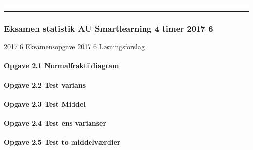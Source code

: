 \documentclass[]{book}
\let\oldparagraph\paragraph
\renewcommand{\paragraph}[1]{\oldparagraph{#1}\mbox{}}
\begin{document}
\begin{center}\rule{0.5\linewidth}{\linethickness}\end{center}

\begin{center}\rule{0.5\linewidth}{\linethickness}\end{center}

\hypertarget{eksamen-statistik-au-smartlearning-4-timer-2017-6}{%
\subsubsection{Eksamen statistik AU Smartlearning 4 timer 2017
6}\label{eksamen-statistik-au-smartlearning-4-timer-2017-6}}

\href{https://www.dropbox.com/s/dlgt1hnh6wu4aja/Statistik\%20eksamensopgave\%20juni\%202017\%20opgave\%202.pdf?dl=1}{2017
6 Eksamensopgave}
\href{https://www.dropbox.com/s/s0fl0lg2i2zk2hh/Eksamen\%202017\%20juni\%20opgave\%202\%20L\%C3\%98SNING.docx?dl=1}{2017
6 Løsningsforslag}

\hypertarget{opgave-2.1-normalfraktildiagram}{%
\paragraph{Opgave 2.1
Normalfraktildiagram}\label{opgave-2.1-normalfraktildiagram}}

\hypertarget{opgave-2.2-test-varians}{%
\paragraph{Opgave 2.2 Test varians}\label{opgave-2.2-test-varians}}

\hypertarget{opgave-2.3-test-middel}{%
\paragraph{Opgave 2.3 Test Middel}\label{opgave-2.3-test-middel}}

\hypertarget{opgave-2.4-test-ens-varianser}{%
\paragraph{Opgave 2.4 Test ens
varianser}\label{opgave-2.4-test-ens-varianser}}

\hypertarget{opgave-2.5-test-to-middelvrdier}{%
\paragraph{Opgave 2.5 Test to
middelværdier}\label{opgave-2.5-test-to-middelvrdier}}
\end{document}
